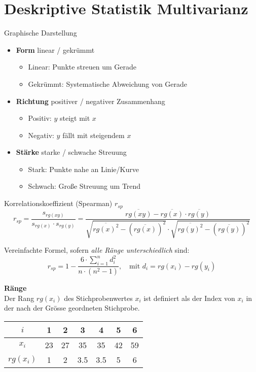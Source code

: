 \section{Deskriptive Statistik Multivarianz}

\begin{concept}{Graphische Darstellung}
\begin{itemize}
 \item \textbf{Form} \hspace{1.5cm} linear / gekrümmt
    \begin{itemize}
        \item Linear: Punkte streuen um Gerade
        \item Gekrümmt: Systematische Abweichung von Gerade
    \end{itemize}
 \item \textbf{Richtung} \hspace{0.85cm} positiver / negativer Zusammenhang
    \begin{itemize}
        \item Positiv: $y$ steigt mit $x$
        \item Negativ: $y$ fällt mit steigendem $x$
    \end{itemize}
 \item \textbf{Stärke} \hspace{1.2cm} starke / schwache Streuung
    \begin{itemize}
        \item Stark: Punkte nahe an Linie/Kurve
        \item Schwach: Große Streuung um Trend
    \end{itemize}
\end{itemize}
\end{concept}

\begin{definition}{Korrelationskoeffizient (Spearman) $r_{sp}$}
$$r_{sp} = \frac{s_{rg(xy)}}{s_{rg(x)} \cdot s_{rg(y)}} = \frac{\overline{rg(xy)} - \overline{rg(x)} \cdot \overline{rg(y)}}{\sqrt{\overline{rg(x)^2} - (\overline{rg(x)})^2} \cdot \sqrt{\overline{rg(y)^2} - (\overline{rg(y)})^2}}$$

Vereinfachte Formel, sofern \emph{alle Ränge unterschiedlich} sind:
$$r_{sp} = 1 - \frac{6 \cdot \sum_{i=1}^n d_i^2}{n \cdot (n^2 - 1)}, \quad \text{mit } d_i = rg(x_i) - rg(y_i)$$

\textbf{Ränge}\\
Der Rang $rg(x_i)$ des Stichprobenwertes $x_i$ ist definiert als der Index von $x_i$ in der nach der Grösse geordneten Stichprobe.

\begin{center}
\begin{tabular}{|c|c|c|c|c|c|c|}
\hline
$i$ & 1 & 2 & 3 & 4 & 5 & 6 \\
\hline
$x_i$ & 23 & 27 & 35 & 35 & 42 & 59 \\
\hline
$rg(x_i)$ & 1 & 2 & 3.5 & 3.5 & 5 & 6 \\
\hline
\end{tabular}
\end{center}
\end{definition}

